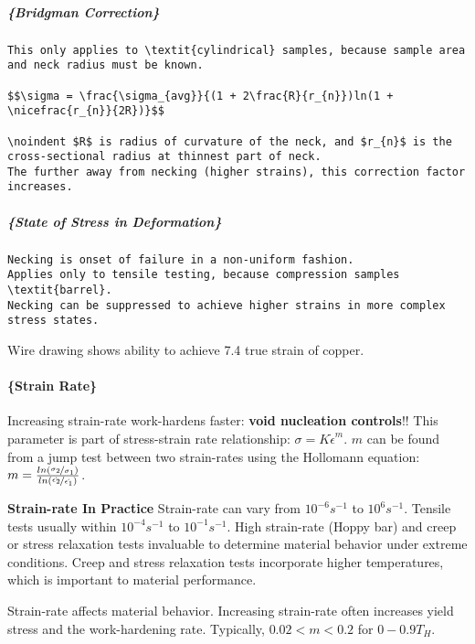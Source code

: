 \documentclass[
]{article}
\begin{document}
\hypertarget{bridgman-correction}{%
\subparagraph{\{Bridgman Correction\}}\label{bridgman-correction}}

\begin{verbatim}
This only applies to \textit{cylindrical} samples, because sample area and neck radius must be known.

$$\sigma = \frac{\sigma_{avg}}{(1 + 2\frac{R}{r_{n}})ln(1 + \nicefrac{r_{n}}{2R})}$$

\noindent $R$ is radius of curvature of the neck, and $r_{n}$ is the cross-sectional radius at thinnest part of neck.
The further away from necking (higher strains), this correction factor increases.
\end{verbatim}

\hypertarget{state-of-stress-in-deformation}{%
\subparagraph{\{State of Stress in
Deformation\}}\label{state-of-stress-in-deformation}}

\begin{verbatim}
Necking is onset of failure in a non-uniform fashion.
Applies only to tensile testing, because compression samples \textit{barrel}.
Necking can be suppressed to achieve higher strains in more complex stress states.
\end{verbatim}

{Wire drawing shows ability to achieve 7.4 true strain of copper.}

\hypertarget{strain-rate}{%
\paragraph{\{Strain Rate\}}\label{strain-rate}}

Increasing strain-rate work-hardens faster:
\textbf{void nucleation controls}!! This parameter is part of
stress-strain rate relationship: \(\sigma = K\dot{\epsilon}^{m}\). \(m\)
can be found from a jump test between two strain-rates using the
Hollomann equation:
\(m = \frac{ln(\nicefrac{\sigma_{2}}{\sigma_{1}})}{ln(\nicefrac{\dot{\epsilon_{2}}}{\dot{\epsilon_{1}}})}\).

\textbf{Strain-rate In Practice} Strain-rate can vary from
\(10^{-6}s^{-1}\) to \(10^{6}s^{-1}\). Tensile tests usually within
\(10^{-4}s^{-1}\) to \(10^{-1}s^{-1}\). High strain-rate (Hoppy bar) and
creep or stress relaxation tests invaluable to determine material
behavior under extreme conditions. Creep and stress relaxation tests
incorporate higher temperatures, which is important to material
performance.

Strain-rate affects material behavior. Increasing strain-rate often
increases yield stress and the work-hardening rate. Typically,
\(0.02<m<0.2\) for \(0-0.9T_{H}\).
\end{document}

